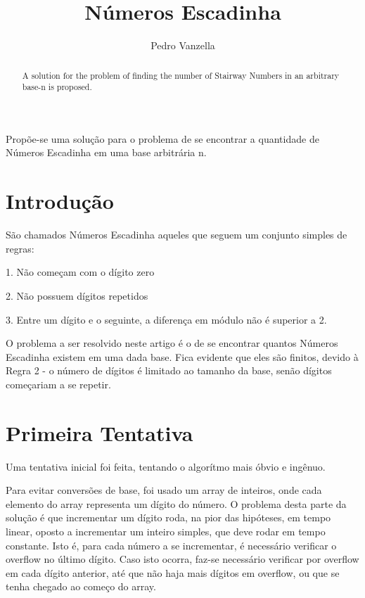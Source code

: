 \documentclass[12pt]{article}
\title{Números Escadinha}
\author{Pedro Vanzella\inst{1}}
\newenvironment{lyxlist}[1]
{\begin{list}{}
{\settowidth{\labelwidth}{#1}
 \setlength{\leftmargin}{\labelwidth}
 \addtolength{\leftmargin}{\labelsep}
 \renewcommand{\makelabel}[1]{##1\hfil}}}
{\end{list}}
\begin{document}
\maketitle
\begin{abstract}
A solution for the problem of finding the number of Stairway Numbers
in an arbitrary base-n is proposed.
\end{abstract}
\begin{resumo}
Propõe-se uma solução para o problema de se encontrar a quantidade de Números Escadinha em uma base arbitrária n.
\end{resumo}


\section{Introdução}\label{section:intro}

São chamados Números Escadinha aqueles que seguem um conjunto simples
de regras:
\begin{lyxlist}{00.00.0000}
\item [{1.}] Não começam com o dígito zero
\item [{2.}] Não possuem dígitos repetidos
\item [{3.}] Entre um dígito e o seguinte, a diferença em módulo não é
superior a 2.
\end{lyxlist}
O problema a ser resolvido neste artigo é o de se encontrar quantos
Números Escadinha existem em uma dada base. Fica evidente que eles
são finitos, devido à Regra 2 - o número de dígitos é limitado ao
tamanho da base, senão dígitos começariam a se repetir.


\section{Primeira Tentativa}\label{section:primeira}

Uma tentativa inicial foi feita, tentando o algorítmo mais óbvio e
ingênuo.

Para evitar conversões de base, foi usado um array de inteiros, onde
cada elemento do array representa um dígito do número. O problema
desta parte da solução é que incrementar um dígito roda, na pior das
hipóteses, em tempo linear, oposto a incrementar um inteiro simples,
que deve rodar em tempo constante. Isto é, para cada número a se incrementar,
é necessário verificar o overflow no último dígito. Caso isto ocorra,
faz-se necessário verificar por overflow em cada dígito anterior,
até que não haja mais dígitos em overflow, ou que se tenha chegado
ao começo do array. 
\end{document}
